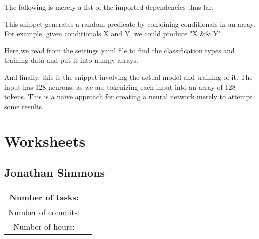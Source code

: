 \documentclass{article}
\begin{document}
    The following is merely a list of the imported dependencies thus-far.
    

    This snippet generates a random predicate by conjoining conditionals in an array.
    For example, given conditionals X and Y, we could produce "X \&\& Y".
    

    Here we read from the settings yaml file to find the classification types and training data and put it into numpy arrays.
    

    And finally, this is the snippet involving the actual model and training of it.
    The input has 128 neurons, as we are tokenizing each input into an array of 128 tokens.
    This is a naive approach for creating a neural network merely to attempt some results.
    


    

    

    

    \section{Worksheets}


    \subsection*{Jonathan Simmons}

    \begin{center}
        \begin{tabular}{||c c ||}
            \hline
            Number of tasks: &  \\
            \hline
            Number of commits: &  \\
            \hline
            Number of hours: &  \\
            \hline
        \end{tabular}
    \end{center}
\end{document}
